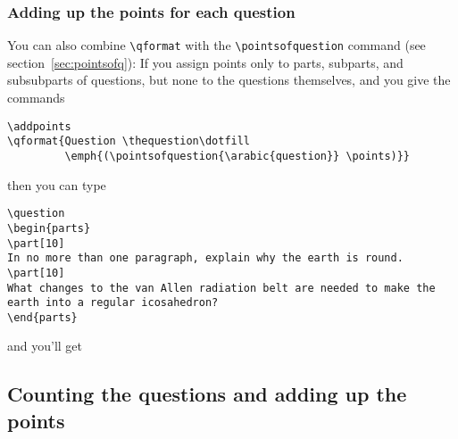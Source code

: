\documentclass[12pt]{exam}
\begin{document}
\subsubsection{Adding up the points for each question}
\label{sec:adding}

You can also combine \verb"\qformat" with the \verb"\pointsofquestion"
command (see section~\ref{sec:pointsofq}): If you assign points only
to parts, subparts, and subsubparts of questions, but none to the
questions themselves, and you give the commands
\begin{verbatim}
\addpoints
\qformat{Question \thequestion\dotfill
         \emph{(\pointsofquestion{\arabic{question}} \points)}}
\end{verbatim}
then you can type
%
\begin{verbatim}
\question
\begin{parts}
\part[10]
In no more than one paragraph, explain why the earth is round.
\part[10]
What changes to the van Allen radiation belt are needed to make the
earth into a regular icosahedron?
\end{parts}
\end{verbatim}
and you'll get
%
\nopointsinmargin
{}
\begin{questions}
\question
{}
\end{questions}
\noqformat


\subsection{Counting the questions and adding up the points}
\label{sec:Count}
\end{document}
